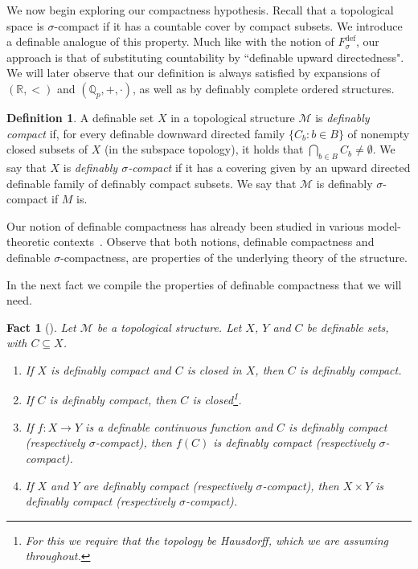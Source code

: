 \documentclass[12pt]{article}
\newcommand{\Mm}{\mathcal{M}}
\newcommand{\dF}{\ensuremath{F_\sigma^{\text{def}}}}
\newcommand{\R}{\mathbb{R}}
\newcommand{\Qp}{\mathbb{Q}_p}
\newtheorem{fact}[theorem]{Fact}
\theoremstyle{definition}
\newtheorem{definition}[theorem]{Definition}
\theoremstyle{remark}
\begin{document}
We now begin exploring our compactness hypothesis. Recall that a topological space is $\sigma$-compact if it has a countable cover by compact subsets. We introduce a definable analogue of this property. Much like with the notion of $\dF$, our approach is that of substituting countability by ``definable upward directedness". We will later observe that our definition is always satisfied by expansions of $(\R,<)$ and $(\Qp,+,\cdot)$, as well as by definably complete ordered structures.

\begin{definition}\label{def:compact}
A definable set $X$ in a topological structure $\Mm$ is \emph{definably compact} if, for every definable downward directed family $\{C_b :b\in B\}$ of nonempty closed subsets of $X$ (in the subspace topology), it holds that $\bigcap_{b\in B} C_b \neq \emptyset$. 
We say that $X$ is \emph{definably $\sigma$-compact} if it has a covering given by an upward directed definable family of definably compact subsets. We say that $\Mm$ is definably $\sigma$-compact if $M$ is. 
\end{definition}

Our notion of definable compactness has already been studied in various model-theoretic contexts~\cite{johnson14, and-defcomp, JY-padic-comp}. Observe that both notions, definable compactness and definable $\sigma$-compactness, are properties of the underlying theory of the structure. 

In the next fact we compile the properties of definable compactness that we will need. 
\begin{fact}[\cite{johnson14}] \label{fct:comp-basic}
Let $\Mm$ be a topological structure. Let $X$, $Y$ and $C$ be definable sets, with $C\subseteq X$.
\begin{enumerate}[(1)]
    \item If $X$ is definably compact and $C$ is closed in $X$, then $C$ is definably compact. 
    \item If $C$ is definably compact, then $C$ is closed\footnote{For this we require that the topology be Hausdorff, which we are assuming throughout.}. 
    \item If $f:X\rightarrow Y$ is a definable continuous function and $C$ is definably compact (respectively $\sigma$-compact), then $f(C)$ is definably compact (respectively $\sigma$-compact). 
    \item If $X$ and $Y$ are definably compact (respectively $\sigma$-compact), then $X\times Y$ is definably compact (respectively $\sigma$-compact).
\end{enumerate}
\end{fact}
\end{document}
